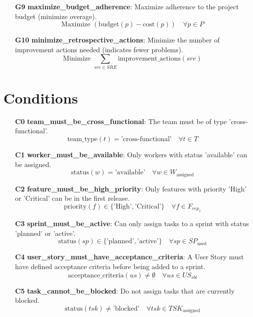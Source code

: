 \documentclass[11pt]{article}
\begin{document}
\begin{itemize}
    \item[\textbf{G9}] \textbf{maximize\_budget\_adherence}: Maximize adherence to the project budget (minimize overage).
    \[ \text{Maximize } \left( \text{budget}(p) - \text{cost}(p) \right) \quad \forall p \in P \]

    \item[\textbf{G10}] \textbf{minimize\_retrospective\_actions}: Minimize the number of improvement actions needed (indicates fewer problems).
    \[ \text{Minimize } \sum_{sre \in SRE} \text{improvement\_actions}(sre) \]
\end{itemize}

\section{Conditions}
\begin{itemize}
    \item[\textbf{C0}] \textbf{team\_must\_be\_cross\_functional}: The team must be of type 'cross-functional'.
    \[ \text{team\_type}(t) = \text{'cross-functional'} \quad \forall t \in T \]

    \item[\textbf{C1}] \textbf{worker\_must\_be\_available}: Only workers with status 'available' can be assigned.
    \[ \text{status}(w) = \text{'available'} \quad \forall w \in W_{\text{assigned}} \]

    \item[\textbf{C2}] \textbf{feature\_must\_be\_high\_priority}: Only features with priority 'High' or 'Critical' can be in the first release.
    \[ \text{priority}(f) \in \{\text{'High'}, \text{'Critical'}\} \quad \forall f \in F_{rep_1} \]

    \item[\textbf{C3}] \textbf{sprint\_must\_be\_active}: Can only assign tasks to a sprint with status 'planned' or 'active'.
    \[ \text{status}(sp) \in \{\text{'planned'}, \text{'active'}\} \quad \forall sp \in SP_{\text{used}} \]

    \item[\textbf{C4}] \textbf{user\_story\_must\_have\_acceptance\_criteria}: A User Story must have defined acceptance criteria before being added to a sprint.
    \[ \text{acceptance\_criteria}(us) \neq \emptyset \quad \forall us \in US_{sbl} \]

    \item[\textbf{C5}] \textbf{task\_cannot\_be\_blocked}: Do not assign tasks that are currently blocked.
    \[ \text{status}(tsk) \neq \text{'blocked'} \quad \forall tsk \in TSK_{\text{assigned}} \]


\end{itemize}
\end{document}
